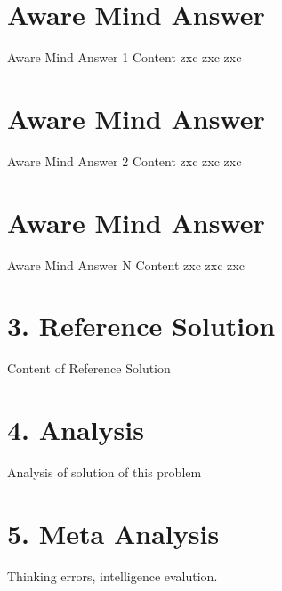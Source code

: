 \documentclass{spaceB}
\begin{document}
\section{Aware Mind Answer} Aware Mind Answer 1 Content zxc zxc zxc

\section{Aware Mind Answer} Aware Mind Answer 2 Content zxc zxc zxc

\section{Aware Mind Answer} Aware Mind Answer N Content zxc zxc zxc

\section{3. Reference Solution} Content of Reference Solution

\section{4. Analysis} Analysis of solution of this problem

\section{5. Meta Analysis} Thinking errors, intelligence evalution.
\end{document}
